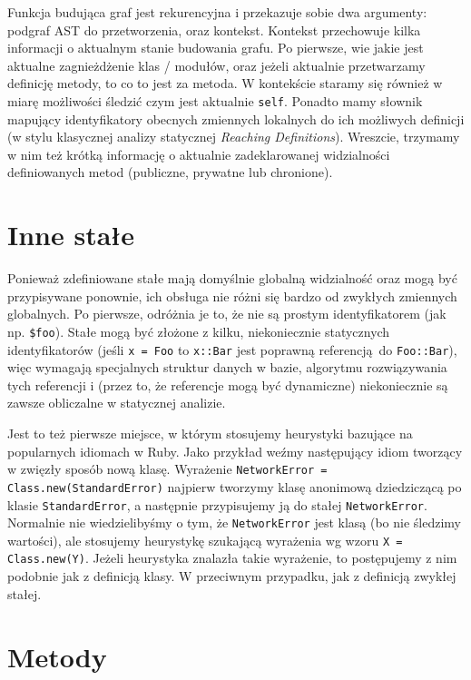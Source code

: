 \documentclass[declaration,shortabstract,mgr]{iithesis}
\begin{document}
Funkcja budująca graf jest rekurencyjna i przekazuje sobie dwa argumenty: podgraf AST do przetworzenia, oraz kontekst. Kontekst przechowuje kilka informacji o aktualnym stanie budowania grafu. Po pierwsze, wie jakie jest aktualne zagnieżdżenie klas / modułów, oraz jeżeli aktualnie przetwarzamy definicję metody, to co to jest za metoda. W kontekście staramy się również w miarę możliwości śledzić czym jest aktualnie \texttt{self}. Ponadto mamy słownik mapujący identyfikatory obecnych zmiennych lokalnych do ich możliwych definicji (w stylu klasycznej analizy statycznej \emph{Reaching Definitions}). Wreszcie, trzymamy w nim też krótką informację o aktualnie zadeklarowanej widzialności definiowanych metod (publiczne, prywatne lub chronione).

\section{Inne stałe}

Ponieważ zdefiniowane stałe mają domyślnie globalną widzialność oraz mogą być przypisywane ponownie, ich obsługa nie różni się bardzo od zwykłych zmiennych globalnych. Po pierwsze, odróżnia je to, że nie są prostym identyfikatorem (jak np. \texttt{\$foo}). Stałe mogą być złożone z kilku, niekoniecznie statycznych identyfikatorów (jeśli \texttt{x = Foo} to \texttt{x::Bar} jest poprawną referencją do \texttt{Foo::Bar}), więc wymagają specjalnych struktur danych w bazie, algorytmu rozwiązywania tych referencji i (przez to, że referencje mogą być dynamiczne) niekoniecznie są zawsze obliczalne w statycznej analizie.

Jest to też pierwsze miejsce, w którym stosujemy heurystyki bazujące na popularnych idiomach w Ruby. Jako przykład weźmy następujący idiom tworzący w zwięzły sposób nową klasę. Wyrażenie \texttt{NetworkError = Class.new(StandardError)} najpierw tworzymy klasę anonimową dziedziczącą po klasie \texttt{StandardError}, a następnie przypisujemy ją do stałej \texttt{NetworkError}. Normalnie nie wiedzielibyśmy o tym, że \texttt{NetworkError} jest klasą (bo nie śledzimy wartości), ale stosujemy heurystykę szukającą wyrażenia wg wzoru \texttt{X = Class.new(Y)}. Jeżeli heurystyka znalazła takie wyrażenie, to postępujemy z nim podobnie jak z definicją klasy. W przeciwnym przypadku, jak z definicją zwykłej stałej.

\section{Metody}
\end{document}

